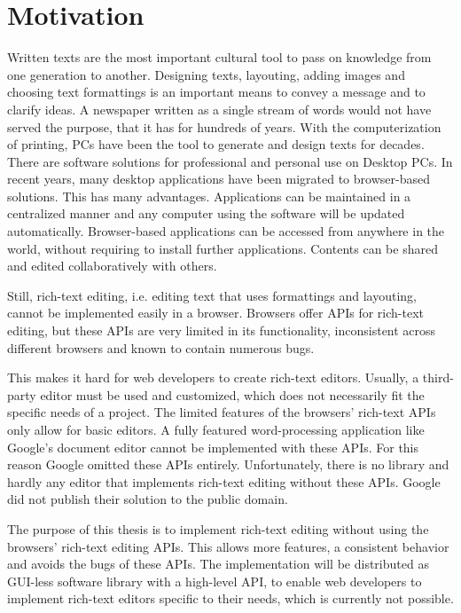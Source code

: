 \section{Motivation}

Written texts are the most important cultural tool to pass on knowledge from one generation to another. Designing texts, layouting, adding images and choosing text formattings is an important means to convey a message and to clarify ideas. A newspaper written as a single stream of words would not have served the purpose, that it has for hundreds of years.
With the computerization of printing, PCs have been the tool to generate and design texts for decades. There are software solutions for professional and personal use on Desktop PCs.
In recent years, many desktop applications have been migrated to browser-based solutions. This has many advantages. Applications can be maintained in a centralized manner and any computer using the software will be updated automatically. Browser-based applications can be accessed from anywhere in the world, without requiring to install further applications. Contents can be shared and edited collaboratively with others.

Still, rich-text editing, i.e. editing text that uses formattings and layouting, cannot be implemented easily in a browser. Browsers offer APIs for rich-text editing, but these APIs are very limited in its functionality, inconsistent across different browsers and known to contain numerous bugs.

This makes it hard for web developers to create rich-text editors. Usually, a third-party editor must be used and customized, which does not necessarily fit the specific needs of a project. The limited features of the browsers' rich-text APIs only allow for basic editors. A fully featured word-processing application like Google's document editor cannot be implemented with these APIs. For this reason Google omitted these APIs entirely. Unfortunately, there is no library and hardly any editor that implements rich-text editing without these APIs. Google did not publish their solution to the public domain.

The purpose of this thesis is to implement rich-text editing without using the browsers' rich-text editing APIs. This allows more features, a consistent behavior and avoids the bugs of these APIs. The implementation will be distributed as GUI-less software library with a high-level API, to enable web developers to implement rich-text editors specific to their needs, which is currently not possible.


